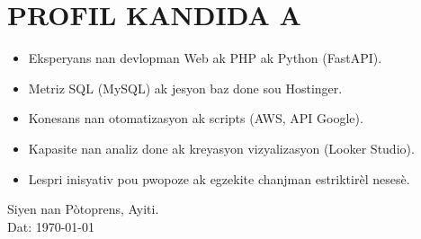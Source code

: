 \documentclass[12pt,a4paper]{article}
\begin{document}
\section{PROFIL KANDIDA A}
\begin{itemize}
    \item Eksperyans nan devlopman Web ak PHP ak Python (FastAPI).
    \item Metriz SQL (MySQL) ak jesyon baz done sou Hostinger.
    \item Konesans nan otomatizasyon ak scripts (AWS, API Google).
    \item Kapasite nan analiz done ak kreyasyon vizyalizasyon (Looker Studio).
    \item Lespri inisyativ pou pwopoze ak egzekite chanjman estriktirèl nesesè.
\end{itemize}

\vspace{1.5cm}

\begin{flushleft}
    Siyen nan Pòtoprens, Ayiti. \\
    Dat: \today
\end{flushleft}
\end{document}
